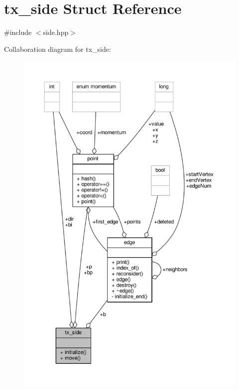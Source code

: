 \hypertarget{structtx__side}{\section{tx\-\_\-side Struct Reference}
\label{structtx__side}
}


{\ttfamily \#include $<$side.\-hpp$>$}



Collaboration diagram for tx\-\_\-side\-:
\nopagebreak
\begin{figure}[H]
\begin{center}
\leavevmode
\includegraphics[width=350pt]{structtx__side__coll__graph}
\end{center}
\end{figure}

